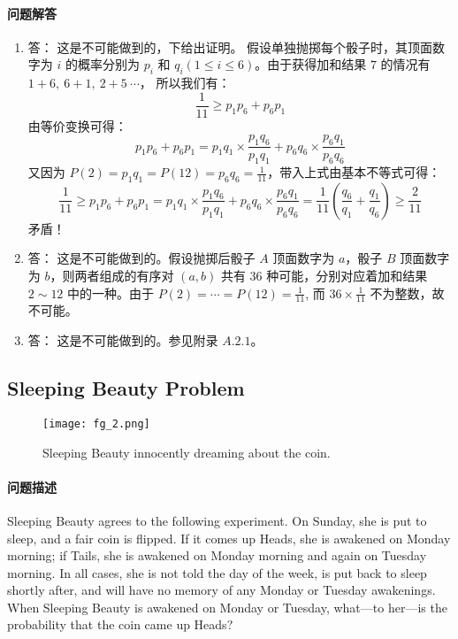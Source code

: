 		\paragraph{问题解答}
		\begin{enumerate}[\indent (1)]
			\item 答： 这是不可能做到的，下给出证明。
			\proof 假设单独抛掷每个骰子时，其顶面数字为 $i$ 的概率分别为 $p_i$ 和 $  q_i (1 \le i \le 6) $。由于获得加和结果 $7$ 的情况有 $1+6, \  6+1, \  2+5 \  \cdots $， 所以我们有： $$ \frac{1}{11} \ge p_1 p_6 + p_6 p_1 $$
			由等价变换可得： $$p_1 p_6 + p_6 p_1 = p_1 q_1 \times{ \frac{p_1 q_6}{p_1 q_1} } + p_6 q_6 \times{ \frac{p_6 q_1}{p_6 q_6} } $$
			 又因为 $ P(2) = p_1 q_1 = P(12) = p_6 q_6 = \frac{1}{11} $，带入上式由基本不等式可得：
			 $$ \frac{1}{11} \ge p_1 p_6 + p_6 p_1 = p_1 q_1 \times{ \frac{p_1 q_6}{p_1 q_1} } + p_6 q_6 \times{ \frac{p_6 q_1}{p_6 q_6} }  = \frac{1}{11} \left( \frac{q_6}{q_1} + \frac{q_1}{q_6} \right) \ge \frac{2}{11} $$
			 矛盾！
			\item 答： 这是不可能做到的。假设抛掷后骰子 $A$ 顶面数字为 $a$，骰子 $B$ 顶面数字为 $b$，则两者组成的有序对 $(a,b)$ 共有 $36$ 种可能，分别对应着加和结果 $2 \sim 12$ 中的一种。由于 $P(2) = \cdots = P(12) = \frac{1}{11}$, 而 $36 \times \frac{1}{11}$ 不为整数，故不可能。
			\item 答： 这是不可能做到的。参见附录 $A.2.1$。

		\end{enumerate}
	\subsection{Sleeping Beauty Problem}
		\begin{figure}[htbp]
			\centering
			\texttt{[image: fg\_2.png]}
			\caption{Sleeping Beauty innocently dreaming about the coin.}
			\label{fig: Sleeping Beauty innocently dreaming about the coin.}
		\end{figure}
		\paragraph{问题描述}
			Sleeping Beauty agrees to the following experiment. On Sunday, she is put to sleep, and a fair coin is flipped. If it comes up Heads, she is awakened on Monday morning; if Tails, she is awakened on Monday morning and again on Tuesday morning. In all cases, she is not told the day of the week, is put back to sleep shortly after, and will have no memory of any Monday or Tuesday awakenings.
			When Sleeping Beauty is awakened on Monday or Tuesday, what—to her—is  the probability that the coin came up Heads?
